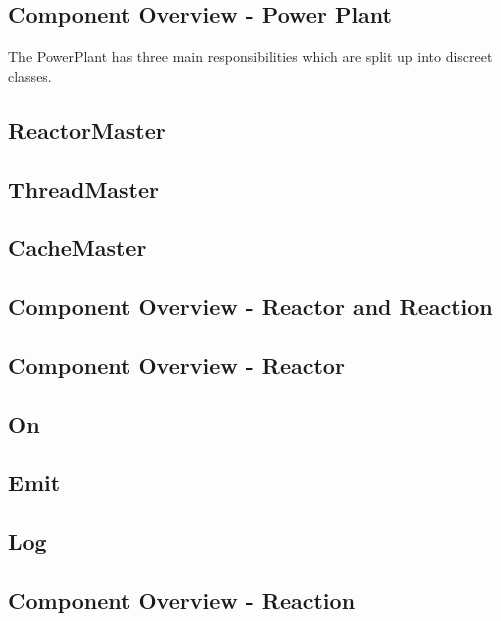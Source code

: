 \documentclass[english,12pt]{scrartcl}
\begin{document}
		\subsection{Component Overview - Power Plant}
			The PowerPlant has three main responsibilities which are split up into discreet classes.
	
			\subsection{ReactorMaster}
	
			\subsection{ThreadMaster}
	
			\subsection{CacheMaster}
		
		\subsection{Component Overview - Reactor and Reaction}

		\subsection{Component Overview - Reactor}
	
			\subsection{On}
	
			\subsection{Emit}
	
			\subsection{Log}
			
		\subsection{Component Overview - Reaction}
	
\end{document}

